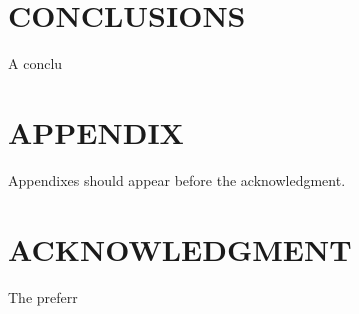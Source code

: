 \documentclass[letterpaper, 10 pt, conference]{ieeeconf}  %
\begin{document}
\section{CONCLUSIONS}

A conclu

\addtolength{\textheight}{-12cm}   %







\section*{APPENDIX}

Appendixes should appear before the acknowledgment.

\section*{ACKNOWLEDGMENT}

The preferr






\end{document}

